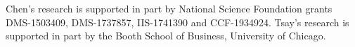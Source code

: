 \address{Ruey Tsay\\
  Booth School of Business\\
  University of Chicago\\
  5807 S. Woodlawn Ave, Chicago, IL 60637\\
  USA\\
  }
  
\noindent Chen's research is supported in part by
National Science Foundation grants DMS-1503409, DMS-1737857, IIS-1741390 and CCF-1934924. Tsay's research is supported in part by the Booth School of Business, University of Chicago.
